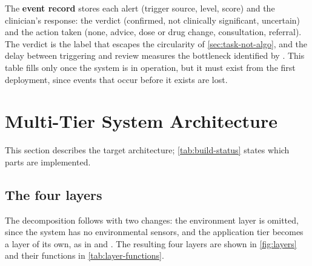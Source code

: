 The \textbf{event record} stores each alert (trigger source, level, score) and the clinician's response: the verdict (confirmed, not clinically significant, uncertain) and the action taken (none, advice, dose or drug change, consultation, referral). The verdict is the label that escapes the circularity of \cref{sec:task-not-algo}, and the delay between triggering and review measures the bottleneck identified by \textcite{bediang2021}. This table fills only once the system is in operation, but it must exist from the first deployment, since events that occur before it exists are lost.

\section{Multi-Tier System Architecture}\label{sec:architecture}

This section describes the target architecture; \cref{tab:build-status} states which parts are implemented.

\subsection{The four layers}\label{sec:layers}\label{sec:edge-layer}\label{sec:cloud-layer}\label{sec:application-layer}

The decomposition follows \textcite{mucchi2021} with two changes: the environment layer is omitted, since the system has no environmental sensors, and the application tier becomes a layer of its own, as in \textcite{efendi2025} and \textcite{liu2025review}. The resulting four layers are shown in \cref{fig:layers} and their functions in \cref{tab:layer-functions}.

